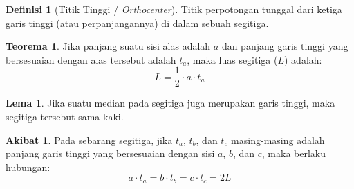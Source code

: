 ﻿\documentclass[aspectratio=169]{beamer}
\theoremstyle{definition}
\newtheorem{definisi}{Definisi}
\newtheorem{teorema}{Teorema}
\newtheorem{lema}{Lema}
\newtheorem{akibat}{Akibat}
\begin{document}
\begin{frame}{\insertsection}{\insertsubsection}
\begin{center}
    \hspace{0.5cm}
  \end{center}

\end{frame}

\begin{frame}{\insertsection}{\insertsubsection}
  \begin{definisi}[Titik Tinggi / \textit{Orthocenter}]
    Titik perpotongan tunggal dari ketiga garis tinggi (atau perpanjangannya) di dalam sebuah segitiga.
  \end{definisi}
  \begin{teorema}
    Jika panjang suatu sisi alas adalah $a$ dan panjang garis tinggi yang bersesuaian dengan alas tersebut adalah $t_a$, maka luas segitiga ($L$) adalah:
    \[
      L = \frac{1}{2} \cdot a \cdot t_a
    \]
  \end{teorema}
\end{frame}

\begin{frame}{\insertsection}{\insertsubsection}
  \begin{lema}
    Jika suatu median pada segitiga juga merupakan garis tinggi,
    maka segitiga tersebut sama kaki.
  \end{lema}
  \begin{akibat}
    Pada sebarang segitiga, jika $t_a$, $t_b$, dan $t_c$ masing-masing adalah panjang garis tinggi yang bersesuaian dengan sisi $a$, $b$, dan $c$, maka berlaku hubungan:
    \[
      a \cdot t_a = b \cdot t_b = c \cdot t_c = 2L
    \]
  \end{akibat}
\end{frame}
\end{document}
